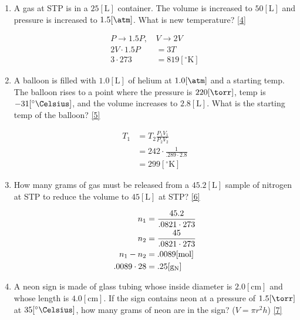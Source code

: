 \documentclass[12pt]{article}
\begin{document}
\begin{enumerate}
    \item A gas at STP is in a $25[\si{\liter}]$ container.  The volume is increased to $50[\si{\liter}]$ and pressure is increased to $1.5[\si{\atm}]$.  What is new temperature?  \eqref{4}

      \begin{equation}
        \begin{split}
          P\rightarrow1.5P,\,&V\rightarrow2V\\
          2V\cdot1.5P&=3T\\
          3\cdot273&=819[^{\circ}\si{\kelvin}]
        \end{split}
        \label{4}
      \end{equation}

    \item A balloon is filled with $1.0[\si{\liter}]$ of helium at $1.0[\si{\atm}]$ and a starting temp.  The balloon rises to a point where the pressure is $220[\si{\torr}]$, temp is $-31[^{\circ}\si{\Celsius}]$, and the volume increases to $2.8[\si{\liter}]$.  What is the starting temp of the balloon? \eqref{5}

      \begin{equation}
        \begin{split}
          T_1&=T_2\frac{P_1V_1}{P_2V_2}\\
          &=242\cdot\frac{1}{.289\cdot2.8}\\
          &=299[^{\circ}\si{\kelvin}]
        \end{split}
        \label{5}
      \end{equation}

    \item How many grams of gas must be released from a $45.2[\si{\liter}]$ sample of nitrogen at STP to reduce the volume to $45[\si{\liter}]$ at STP? \eqref{6}

      \begin{equation}
        \begin{split}
          n_1&=\frac{45.2}{.0821\cdot273}\\
          n_2&=\frac{45}{.0821\cdot273}\\
          n_1-n_2&=.0089[\si{\mole}]\\
          .0089\cdot28&=.25[\si{\gram}_{\ce{N}}]
        \end{split}
        \label{6}
      \end{equation}

    \item A neon sign is made of glass tubing whose inside diameter is $2.0[\si{\centi\meter}]$ and whose length is $4.0[\si{\centi\meter}]$.  If the sign contains neon at a pressure of $1.5[\si{\torr}]$ at $35[^{\circ}\si{\Celsius}]$, how many grams of neon are in the sign? ($V=\pi r^2 h$) \eqref{7}


\end{enumerate}
\end{document}
